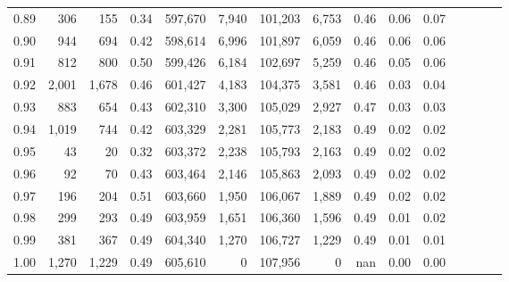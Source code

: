 \begin{tabular}{rrrcrrrrrrrrrrr}
0.89 &     306 &    155 &                                       0.34 &  597,670 &    7,940 &  101,203 &    6,753 &  0.46 &  0.06 &                         0.07 \\
0.90 &     944 &    694 &                                       0.42 &  598,614 &    6,996 &  101,897 &    6,059 &  0.46 &  0.06 &                         0.06 \\
0.91 &     812 &    800 &                                       0.50 &  599,426 &    6,184 &  102,697 &    5,259 &  0.46 &  0.05 &                         0.06 \\
0.92 &   2,001 &  1,678 &                                       0.46 &  601,427 &    4,183 &  104,375 &    3,581 &  0.46 &  0.03 &                         0.04 \\
0.93 &     883 &    654 &                                       0.43 &  602,310 &    3,300 &  105,029 &    2,927 &  0.47 &  0.03 &                         0.03 \\
0.94 &   1,019 &    744 &                                       0.42 &  603,329 &    2,281 &  105,773 &    2,183 &  0.49 &  0.02 &                         0.02 \\
0.95 &      43 &     20 &                                       0.32 &  603,372 &    2,238 &  105,793 &    2,163 &  0.49 &  0.02 &                         0.02 \\
0.96 &      92 &     70 &                                       0.43 &  603,464 &    2,146 &  105,863 &    2,093 &  0.49 &  0.02 &                         0.02 \\
0.97 &     196 &    204 &                                       0.51 &  603,660 &    1,950 &  106,067 &    1,889 &  0.49 &  0.02 &                         0.02 \\
0.98 &     299 &    293 &                                       0.49 &  603,959 &    1,651 &  106,360 &    1,596 &  0.49 &  0.01 &                         0.02 \\
0.99 &     381 &    367 &                                       0.49 &  604,340 &    1,270 &  106,727 &    1,229 &  0.49 &  0.01 &                         0.01 \\
1.00 &   1,270 &  1,229 &                                       0.49 &  605,610 &        0 &  107,956 &        0 &   nan &  0.00 &                         0.00 \\
\bottomrule
\end{tabular}
